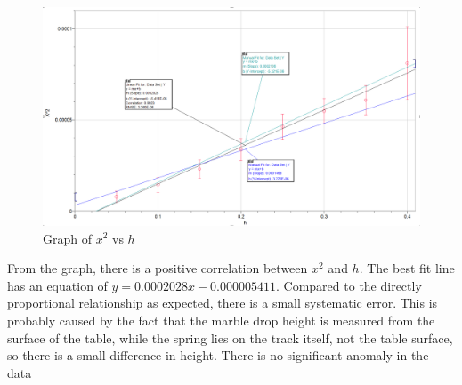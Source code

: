 \FloatBarrier
\begin{figure}
    \includegraphics[width = \textwidth]{graph.png}
    \caption{Graph of $x^2$ vs $h$}
\end{figure} %
\FloatBarrier
From the graph, there is a positive correlation between $x^2$ and $h$. The best fit line has an equation of $y = 0.0002028x - 0.000005411$. Compared to the directly proportional relationship as expected, there is a small systematic error. This is probably caused by the fact that the marble drop height is measured from the surface of the table, while the spring lies on the track itself, not the table surface, so there is a small difference in height. There is no significant anomaly in the data